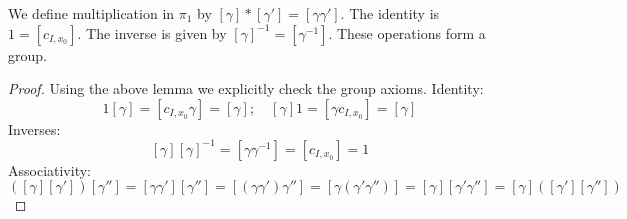 \begin{theorem}
	We define multiplication in \( \pi_1 \) by \( [\gamma] \ast [\gamma'] = [\gamma \gamma'] \).
	The identity is \( 1 = [c_{I,x_0}] \).
	The inverse is given by \( [\gamma]^{-1} = [\gamma^{-1}] \).
	These operations form a group.
\end{theorem}
\begin{proof}
	Using the above lemma we explicitly check the group axioms.
	Identity:
	\[ 1 [\gamma] = [c_{I,x_0}\gamma] = [\gamma];\quad [\gamma] 1 = [\gamma c_{I,x_0}] = [\gamma] \]
	Inverses:
	\[ [\gamma] [\gamma]^{-1} = [\gamma \gamma^{-1}] = [c_{I,x_0}] = 1 \]
	Associativity:
	\[ ([\gamma][\gamma'])[\gamma''] = [\gamma\gamma'][\gamma''] = [(\gamma\gamma')\gamma''] = [\gamma(\gamma'\gamma'')] = [\gamma][\gamma'\gamma''] = [\gamma]([\gamma'][\gamma'']) \]
\end{proof}

